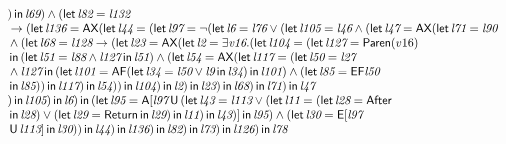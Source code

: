 \documentclass{article}
\newcommand{\U}{\,\mbox{\sf{U}}\,}
\newcommand{\A}{\mbox{\sf{A}}}
\newcommand{\E}{\mbox{\sf{E}}}
\newcommand{\AX}{\mbox{\sf{AX}}}
\newcommand{\AF}{\mbox{\sf{AF}}}
\newcommand{\EF}{\mbox{\sf{EF}}}
\newcommand{\mita}[1]{\mbox{\it{{#1}}}}
\newcommand{\msf}[1]{\mbox{\sf{{#1}}}}
\begin{document}
\[\begin{array}{l}
) \, \mita{\sf{in}} \, \mita{l69}
) \wedge (\mita{\sf{let}} \, \mita{l82} = \mita{l132}\\\mbox{} \rightarrow (\mita{\sf{let}} \, \mita{l136} = \AX(\mita{\sf{let}} \, \mita{l44} = (\mita{\sf{let}} \, \mita{l97} = \neg (\mita{\sf{let}} \, \mita{l6} = \mita{l76} \vee (\mita{\sf{let}} \, \mita{l105} = \mita{l46} \wedge (\mita{\sf{let}} \, \mita{l47} = \AX(\mita{\sf{let}} \, \mita{l71} = \mita{l90}\\\mbox{} \wedge (\mita{\sf{let}} \, \mita{l68} = \mita{l128} \rightarrow (\mita{\sf{let}} \, \mita{l23} = \AX(\mita{\sf{let}} \, \mita{l2} = \exists \mita{v16} . (\mita{\sf{let}} \, \mita{l104} = (\mita{\sf{let}} \, \mita{l127} = \msf{Paren}(v16)\\\mbox{} \, \mita{\sf{in}} \, (\mita{\sf{let}} \, \mita{l51} = \mita{l88} \wedge \mita{l127} \, \mita{\sf{in}} \, \mita{l51}
) \wedge (\mita{\sf{let}} \, \mita{l54} = \AX(\mita{\sf{let}} \, \mita{l117} = (\mita{\sf{let}} \, \mita{l50} = \mita{l27}\\\mbox{} \wedge \mita{l127} \, \mita{\sf{in}} \, (\mita{\sf{let}} \, \mita{l101} = \AF(\mita{\sf{let}} \, \mita{l34} = \mita{l50} \vee \mita{l9} \, \mita{\sf{in}} \, \mita{l34}
) \, \mita{\sf{in}} \, \mita{l101}
) \wedge (\mita{\sf{let}} \, \mita{l85} = \EF\mita{l50}\\\mbox{} \, \mita{\sf{in}} \, \mita{l85}
)
) \, \mita{\sf{in}} \, \mita{l117}
) \, \mita{\sf{in}} \, \mita{l54}
)
) \, \mita{\sf{in}} \, \mita{l104}
) \, \mita{\sf{in}} \, \mita{l2}
) \, \mita{\sf{in}} \, \mita{l23}
) \, \mita{\sf{in}} \, \mita{l68}
) \, \mita{\sf{in}} \, \mita{l71}
) \, \mita{\sf{in}} \, \mita{l47}\\\mbox{}
) \, \mita{\sf{in}} \, \mita{l105}
) \, \mita{\sf{in}} \, \mita{l6}
) \, \mita{\sf{in}} \, (\mita{\sf{let}} \, \mita{l95} = \A[\mita{l97} \U (\mita{\sf{let}} \, \mita{l43} = \mita{l113} \vee (\mita{\sf{let}} \, \mita{l11} = (\mita{\sf{let}} \, \mita{l28} = \msf{After}\\\mbox{} \, \mita{\sf{in}} \, \mita{l28}
) \vee (\mita{\sf{let}} \, \mita{l29} = \msf{Return} \, \mita{\sf{in}} \, \mita{l29}
) \, \mita{\sf{in}} \, \mita{l11}
) \, \mita{\sf{in}} \, \mita{l43}
)]
 \, \mita{\sf{in}} \, \mita{l95}
) \wedge (\mita{\sf{let}} \, \mita{l30} = \E[\mita{l97}\\\mbox{} \U \mita{l113}]
 \, \mita{\sf{in}} \, \mita{l30}
)
) \, \mita{\sf{in}} \, \mita{l44}
) \, \mita{\sf{in}} \, \mita{l136}
) \, \mita{\sf{in}} \, \mita{l82}
) \, \mita{\sf{in}} \, \mita{l73}
) \, \mita{\sf{in}} \, \mita{l126}
) \, \mita{\sf{in}} \, \mita{l78}

\end{array}\]
\end{document}
